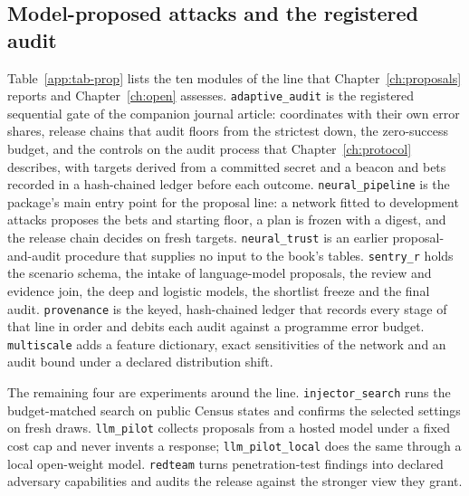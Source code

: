 \subsection*{Model-proposed attacks and the registered audit}

Table~\ref{app:tab-prop} lists the ten modules of the line that Chapter~\ref{ch:proposals}
reports and Chapter~\ref{ch:open} assesses. \texttt{adaptive\_\allowbreak{}audit} is the registered
sequential gate of the companion journal article: coordinates with their own error
shares, release chains that audit floors from the strictest down, the zero-success
budget, and the controls on the audit process that Chapter~\ref{ch:protocol} describes,
with targets derived from a committed secret and a beacon and bets recorded in a
hash-chained ledger before each outcome. \texttt{neural\_\allowbreak{}pipeline} is the package's main
entry point for the proposal line: a network fitted to development attacks proposes the
bets and starting floor, a plan is frozen with a digest, and the release chain decides
on fresh targets. \texttt{neural\_\allowbreak{}trust} is an earlier proposal-and-audit procedure that
supplies no input to the book's tables. \texttt{sentry\_\allowbreak{}r} holds the scenario schema,
the intake of language-model proposals, the review and evidence join, the deep and
logistic models, the shortlist freeze and the final audit. \texttt{provenance} is the
keyed, hash-chained ledger that records every stage of that line in order and debits
each audit against a programme error budget. \texttt{multiscale} adds a feature
dictionary, exact sensitivities of the network and an audit bound under a declared
distribution shift.

The remaining four are experiments around the line. \texttt{injector\_\allowbreak{}search} runs the
budget-matched search on public Census states and confirms the selected settings on
fresh draws. \texttt{llm\_\allowbreak{}pilot} collects proposals from a hosted model under a fixed
cost cap and never invents a response; \texttt{llm\_\allowbreak{}pilot\_\allowbreak{}local} does the same through
a local open-weight model. \texttt{redteam} turns penetration-test findings into
declared adversary capabilities and audits the release against the stronger view they
grant.

